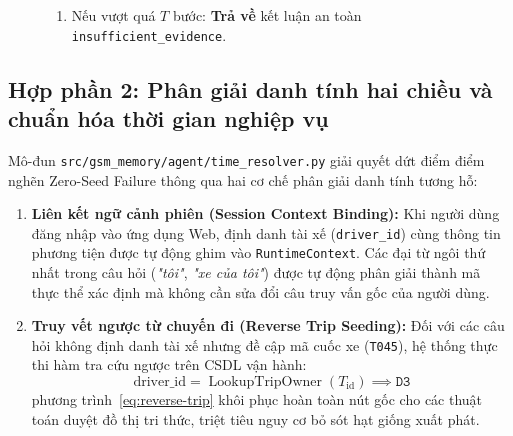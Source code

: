 \documentclass[a4paper,11pt]{article}
\begin{document}
\begin{figure}[htbp]
\begin{tcolorbox}
\begin{enumerate}[noitemsep,topsep=2pt]
\begin{enumerate}[noitemsep]
\begin{itemize}[noitemsep]
            \item Bỏ qua thực thi thực tế, chuyển sang Bước (g).
        \end{itemize}
        \item Thực thi công cụ: $\text{Obs}_t \leftarrow \operatorname{ExecuteTool}(\text{ActName}^*, \text{Params})$.
        \item Cập nhật lịch sử: $\mathcal{M} \leftarrow \mathcal{M} \cup \{(\text{Thought}_t, \text{ActName}^*, \text{Params}, \text{Obs}_t)\}$.
        \item Cập nhật bộ đếm: $\mathcal{C}_{\text{calls}} \leftarrow \mathcal{C}_{\text{calls}} \cup \{(\text{ActName}^*, \text{Params})\}$, $t \leftarrow t + 1$.
    \end{enumerate}
    \item Nếu vượt quá $T$ bước: \textbf{Trả về} kết luận an toàn \nolinkurl{insufficient_evidence}.
\end{enumerate}
\end{tcolorbox}
\label{box:react-alg}
\end{figure}

\subsection{Hợp phần 2: Phân giải danh tính hai chiều và chuẩn hóa thời gian nghiệp vụ}
\label{sec:time-resolver}

Mô-đun \nolinkurl{src/gsm_memory/agent/time_resolver.py} giải quyết dứt điểm điểm nghẽn Zero-Seed Failure thông qua hai cơ chế phân giải danh tính tương hỗ:
\begin{enumerate}[leftmargin=1.5em,topsep=2pt]
    \item \textbf{Liên kết ngữ cảnh phiên (Session Context Binding):} Khi người dùng đăng nhập vào ứng dụng Web, định danh tài xế (\texttt{driver\_id}) cùng thông tin phương tiện được tự động ghim vào \texttt{RuntimeContext}. Các đại từ ngôi thứ nhất trong câu hỏi (\textit{"tôi"}, \textit{"xe của tôi"}) được tự động phân giải thành mã thực thể xác định mà không cần sửa đổi câu truy vấn gốc của người dùng.
    \item \textbf{Truy vết ngược từ chuyến đi (Reverse Trip Seeding):} Đối với các câu hỏi không định danh tài xế nhưng đề cập mã cuốc xe (\texttt{T045}), hệ thống thực thi hàm tra cứu ngược trên CSDL vận hành:
    \begin{equation}
        \text{driver\_id} = \operatorname{LookupTripOwner}(T_{\text{id}}) \implies \texttt{D3}
        \label{eq:reverse-trip}
    \end{equation}
    phương trình~\eqref{eq:reverse-trip} khôi phục hoàn toàn nút gốc cho các thuật toán duyệt đồ thị tri thức, triệt tiêu nguy cơ bỏ sót hạt giống xuất phát.
\end{enumerate}
\end{document}
